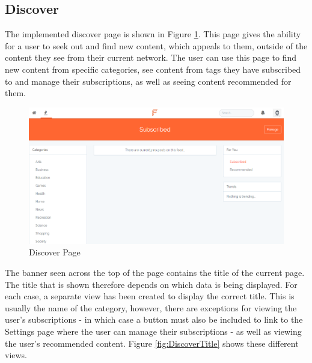 \subsection{Discover}
The implemented discover page is shown in Figure \ref{fig:DiscoverPage}. This page gives the ability for a user to seek out and find new content, which appeals to them, outside of the content they see from their current network. The user can use this page to find new content from specific categories, see content from tags they have subscribed to and manage their subscriptions, as well as seeing content recommended for them.

\begin{figure}[H]
\centering
\includegraphics[width=\textwidth]{Images/Implementation/DiscoverPage}
\caption{Discover Page}
\label{fig:DiscoverPage}
\end{figure}

The banner seen across the top of the page contains the title of the current page. The title that is shown therefore depends on which data is being displayed. For each case, a separate view has been created to display the correct title. This is usually the name of the category, however, there are exceptions for viewing the user's subscriptions - in which case a button must also be included to link to the Settings page where the user can manage their subscriptions - as well as viewing the user's recommended content. Figure \ref{fig:DiscoverTitle} shows these different views.

